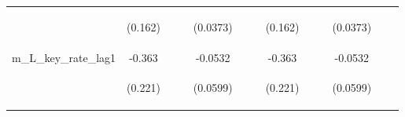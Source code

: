 \documentclass[]{article}
\begin{document}
\begin{center}
\begin{tabular}{lcccccccccccc}
\vspace{4pt} & \begin{footnotesize}(0.162)\end{footnotesize} & \begin{footnotesize}\end{footnotesize} & \begin{footnotesize}\end{footnotesize} & \begin{footnotesize}(0.0373)\end{footnotesize} & \begin{footnotesize}\end{footnotesize} & \begin{footnotesize}\end{footnotesize} & \begin{footnotesize}(0.162)\end{footnotesize} & \begin{footnotesize}\end{footnotesize} & \begin{footnotesize}\end{footnotesize} & \begin{footnotesize}(0.0373)\end{footnotesize} & \begin{footnotesize}\end{footnotesize} & \begin{footnotesize}\end{footnotesize} \\
m\_L\_key\_rate\_lag1 & -0.363 &  &  & -0.0532 &  &  & -0.363 &  &  & -0.0532 &  &  \\
\vspace{4pt} & \begin{footnotesize}(0.221)\end{footnotesize} & \begin{footnotesize}\end{footnotesize} & \begin{footnotesize}\end{footnotesize} & \begin{footnotesize}(0.0599)\end{footnotesize} & \begin{footnotesize}\end{footnotesize} & \begin{footnotesize}\end{footnotesize} & \begin{footnotesize}(0.221)\end{footnotesize} & \begin{footnotesize}\end{footnotesize} & \begin{footnotesize}\end{footnotesize} & \begin{footnotesize}(0.0599)\end{footnotesize} & \begin{footnotesize}\end{footnotesize} & \begin{footnotesize}\end{footnotesize} \\

\end{tabular}
\end{center}
\end{document}
